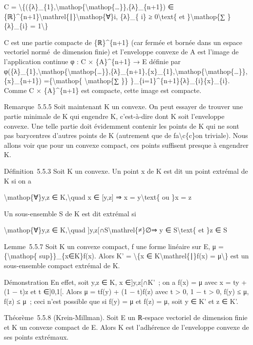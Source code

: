 \documentclass[]{article}
\begin{document}
C =
\textbackslash{}\{(\{λ\}\_\{1\},\textbackslash{}mathop\{\textbackslash{}mathop\{\ldots{}\}\},\{λ\}\_\{n+1\})
∈
\{ℝ\}\^{}\{n+1\}\textbackslash{}mathrel\{∣\}\textbackslash{}mathop\{∀\}i,
\{λ\}\_\{ i\} ≥ 0\textbackslash{}text\{ et \}\textbackslash{}mathop\{∑
\}\{λ\}\_\{i\} = 1\textbackslash{}\}

C est une partie compacte de \{ℝ\}\^{}\{n+1\} (car fermée et bornée dans
un espace vectoriel normé~de dimension finie) et l'enveloppe convexe de
A est l'image de l'application continue φ : C × \{A\}\^{}\{n+1\} → E
définie par
φ(\{λ\}\_\{1\},\textbackslash{}mathop\{\textbackslash{}mathop\{\ldots{}\}\},\{λ\}\_\{n+1\},\{x\}\_\{1\},\textbackslash{}mathop\{\textbackslash{}mathop\{\ldots{}\}\},\{x\}\_\{n+1\})
=\{\textbackslash{}mathop\{ \textbackslash{}mathop\{∑ \}\}
\}\_\{i=1\}\^{}\{n+1\}\{λ\}\_\{i\}\{x\}\_\{i\}. Comme C ×
\{A\}\^{}\{n+1\} est compacte, cette image est compacte.

Remarque~5.5.5 Soit maintenant K un convexe. On peut essayer de trouver
une partie minimale de K qui engendre K, c'est-à-dire dont K soit
l'enveloppe convexe. Une telle partie doit évidemment contenir les
points de K qui ne sont pas barycentres d'autres points de K (autrement
que de fa\textbackslash{}c\{c\}on triviale). Nous allons voir que pour
un convexe compact, ces points suffisent presque à engendrer K.

Définition~5.5.3 Soit K un convexe. Un point x de K est dit un point
extrémal de K si on a

\textbackslash{}mathop\{∀\}y,z ∈ K,\textbackslash{}quad x ∈ {[}y,z{]} ⇒
x = y\textbackslash{}text\{ ou \}x = z

Un sous-ensemble S de K est dit extrémal si

\textbackslash{}mathop\{∀\}y,z ∈ K,\textbackslash{}quad
{]}y,z{[}∩S\textbackslash{}mathrel\{≠\}∅⇒ y ∈ S\textbackslash{}text\{ et
\}z ∈ S

Lemme~5.5.7 Soit K un convexe compact, f une forme linéaire sur E, μ
=\{\textbackslash{}mathop\{ sup\}\}\_\{x∈K\}f(x). Alors K' =
\textbackslash{}\{x ∈ K\textbackslash{}mathrel\{∣\}f(x) =
μ\textbackslash{}\} est un sous-ensemble compact extrémal de K.

Démonstration En effet, soit y,z ∈ K, x ∈{]}y,z{[}∩K'~; on a f(x) = μ
avec x = ty + (1 − t)z et t ∈{]}0,1{[}. Alors μ = tf(y) + (1 − t)f(z)
avec t \textgreater{} 0, 1 − t \textgreater{} 0, f(y) ≤ μ, f(z) ≤ μ~;
ceci n'est possible que si f(y) = μ et f(z) = μ, soit y ∈ K' et z ∈ K'.

Théorème~5.5.8 (Krein-Millman). Soit E un ℝ-espace vectoriel de
dimension finie et K un convexe compact de E. Alors K est l'adhérence de
l'enveloppe convexe de ses points extrémaux.
\end{document}
